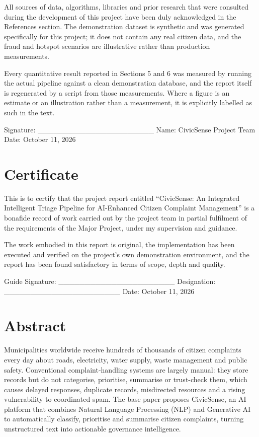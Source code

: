 \documentclass[10pt,letterpaper,oneside]{article}\usepackage{geometry}\geometry{top=1in,bottom=1in,left=1in,right=1in,includeheadfoot}\usepackage{xcolor}\definecolor{color@navy}{HTML}{1F3B63}\definecolor{color@grey}{HTML}{404040}\definecolor{color@hdr}{HTML}{F2F4F7}\usepackage{titlesec}\titleformat{\section}  {\normalfont\huge\bfseries\color@navy}  {}{0pt}{\MakeUppercase}\titleformat{\subsection}  {\normalfont\Large\bfseries\color@navy}  {}{0pt}{}\titleformat{\subsubsection}  {\normalfont\large\bfseries\color@navy}  {}{0pt}{}\titlespacing*{\section}{0pt}{14pt}{6pt}\titlespacing*{\subsection}{0pt}{10pt}{4pt}\titlespacing*{\subsubsection}{0pt}{8pt}{3pt}\setlength{\parindent}{0pt}\setlength{\parskip}{0.6em}\parindent=0pt\usepackage{enumitem}\setlist{nosep,leftmargin=*,itemsep=0pt,topsep=2pt,partopsep=0pt}\usepackage{array}\usepackage{booktabs}\usepackage{caption}\captionsetup{font={small,it},labelfont={bf},labelsep=period,  parskip=2pt,skip=4pt,list=no}\captionsetup[table]{labelfont={bf,small,color@navy},name=Table}\usepackage{graphicx}\usepackage{verbatim}\usepackage{ragged2e}\usepackage{longtable}\usepackage{tabularx}\usepackage{multirow}\usepackage{colortbl}\definecolor{rowshade}{HTML}{F2F4F7}\usepackage{tikz}\usetikzlibrary{positioning,calc}\usepackage[hidelinks]{hyperref}\hypersetup{colorlinks=true,linkcolor=color@navy,urlcolor=color@navy}\pagestyle{fancy}\fancyhf{}\renewcommand{\headrulewidth}{0.4pt}\fancyhead[L]{\small\color@navy CivicSense — Project Report}\fancyhead[R]{\small\color@grey October 11, 2026}\fancyfoot[C]{\small\color@grey An Integrated Intelligent Triage Pipelin}\fancyfoot[R]{\small\color@grey Page \thepage}\usepackage{setspace}\setstretch{1.15}\AtBeginDocument{  \hypersetup{pdftitle={An Integrated Intelligent Triage Pipeline for AI-Enhanced Citizen Complaint Management},    pdfauthor={CivicSense Project Team},    pdfsubject={Project Report},    pdfkeywords={smart cities, NLP, complaint management, e-governance},    pdfcreator={CivicSense Project Team}  }}
\begin{document}
All sources of data, algorithms, libraries and prior research that were consulted during the development of this project have been duly acknowledged in the References section. The demonstration dataset is synthetic and was generated specifically for this project; it does not contain any real citizen data, and the fraud and hotspot scenarios are illustrative rather than production measurements.

Every quantitative result reported in Sections 5 and 6 was measured by running the actual pipeline against a clean demonstration database, and the report itself is regenerated by a script from those measurements. Where a figure is an estimate or an illustration rather than a measurement, it is explicitly labelled as such in the text.

Signature: ______________________
Name: CivicSense Project Team
Date: October 11, 2026
\newpage
{}
{}
\section*{Certificate}

This is to certify that the project report entitled “CivicSense: An Integrated Intelligent Triage Pipeline for AI-Enhanced Citizen Complaint Management” is a bonafide record of work carried out by the project team in partial fulfilment of the requirements of the Major Project, under my supervision and guidance.

The work embodied in this report is original, the implementation has been executed and verified on the project’s own demonstration environment, and the report has been found satisfactory in terms of scope, depth and quality.

Guide Signature: ______________________
Designation: ______________________
Date: October 11, 2026
\newpage
{}
{}
\section*{Abstract}

Municipalities worldwide receive hundreds of thousands of citizen complaints every day about roads, electricity, water supply, waste management and public safety. Conventional complaint-handling systems are largely manual: they store records but do not categorise, prioritise, summarise or trust-check them, which causes delayed responses, duplicate records, misdirected resources and a rising vulnerability to coordinated spam. The base paper proposes CivicSense, an AI platform that combines Natural Language Processing (NLP) and Generative AI to automatically classify, prioritise and summarise citizen complaints, turning unstructured text into actionable governance intelligence.
\end{document}
